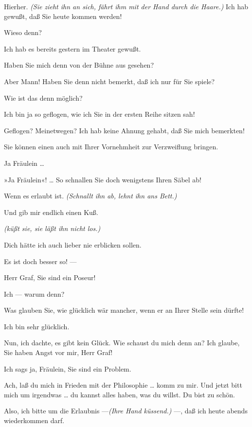 \documentclass[
	final,
	a4paper,
	ngerman,
	mpinclude = true, %
	twoside = true,
	open = right,
	cleardoublepage = plain,
	DIV = 13,
	BCOR = 1cm,
	titlepage = firstiscover,
	]{scrbook}
\newcommand{\direction}[1]{\textit{(#1)}}
\newcommand{\thecharacter}[1]{\textup{\textsc{#1}}\xspace}
\newcommand{\theschauspielerin}{\thecharacter{Schauspielerin}}
\newcommand{\thegraf}{\thecharacter{Graf}}
\newcommand{\character}[1]{\item[#1:]}
\newcommand{\schauspielerin}{\character{\theschauspielerin}}
\newcommand{\graf}{\character{\thegraf}}
\begin{document}
\begin{play}
	\schauspielerin
	Hierher. \direction{Sie zieht ihn an sich, fährt ihm mit der Hand durch die Haare.} Ich hab gewußt, daß Sie heute kommen werden!

	\graf
	Wieso denn?

	\schauspielerin
	Ich hab es bereits gestern im Theater gewußt.

	\graf
	Haben Sie mich denn von der Bühne aus gesehen?

	\schauspielerin
	Aber Mann! Haben Sie denn nicht bemerkt, daß ich nur für Sie spiele?

	\graf
	Wie ist das denn möglich?

	\schauspielerin
	Ich bin ja so geflogen, wie ich Sie in der ersten Reihe sitzen sah!

	\graf
	Geflogen? Meinetwegen? Ich hab keine Ahnung gehabt, daß Sie mich bemerkten!

	\schauspielerin
	Sie können einen auch mit Ihrer Vornehmheit zur Verzweiflung bringen.

	\graf
	Ja Fräulein \ldots{}

	\schauspielerin
	»Ja Fräulein«! \ldots{} So schnallen Sie doch wenigstens Ihren Säbel ab!

	\graf
	Wenn es erlaubt ist. \direction{Schnallt ihn ab, lehnt ihn ans Bett.}

	\schauspielerin
	Und gib mir endlich einen Kuß.

	\graf
	\direction{küßt sie, sie läßt ihn nicht los.}

	\schauspielerin
	Dich hätte ich auch lieber nie erblicken sollen.

	\graf
	Es ist doch besser so! ---

	\schauspielerin
	Herr Graf, Sie sind ein Poseur!

	\graf
	Ich --- warum denn?

	\schauspielerin
	Was glauben Sie, wie glücklich wär mancher, wenn er an Ihrer Stelle sein dürfte!

	\graf
	Ich bin sehr glücklich.

	\schauspielerin
	Nun, ich dachte, es gibt kein Glück. Wie schaust du mich denn an? Ich glaube, Sie haben Angst vor mir, Herr Graf!

	\graf
	Ich sags ja, Fräulein, Sie sind ein Problem.

	\schauspielerin
	Ach, laß du mich in Frieden mit der Philosophie \ldots{} komm zu mir. Und jetzt bitt mich um irgendwas \ldots{} du kannst alles haben, was du willst. Du bist zu schön.

	\graf
	Also, ich bitte um die Erlaubnis ---\direction{Ihre Hand küssend.} ---, daß ich heute abends wiederkommen darf.


\end{play}
\end{document}
